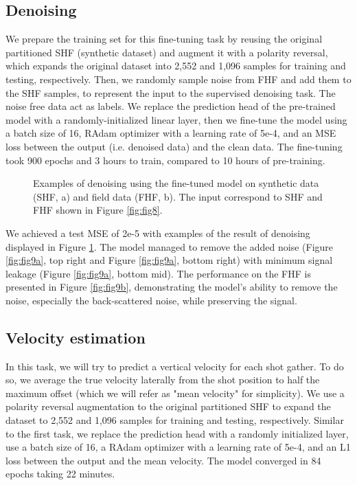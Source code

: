 \documentclass{article}
\begin{document}
\subsection{Denoising}
\label{sec:denoising_field}
We prepare the training set for this fine-tuning task by reusing the original partitioned SHF (synthetic dataset) and augment it with a polarity reversal, which expands the original dataset into 2,552 and 1,096 samples for training and testing, respectively. Then, we randomly sample noise from FHF and add them to the SHF samples, to represent the input to the supervised denoising task. The noise free data act as labels. We replace the prediction head of the pre-trained model with a randomly-initialized linear layer, then we fine-tune the model using a batch size of 16, RAdam optimizer with a learning rate of 5e-4, and an MSE loss between the output (i.e. denoised data) and the clean data. The fine-tuning took 900 epochs and 3 hours to train, compared to 10 hours of pre-training.

\begin{figure}[h]
    \centering
    \caption{Examples of denoising using the fine-tuned model on synthetic data (SHF, a) and field data (FHF, b). The input correspond to SHF and FHF shown in Figure \ref{fig:fig8}.}
    \label{fig:fig9}
\end{figure}

We achieved a test MSE of 2e-5 with examples of the result of denoising displayed in Figure \ref{fig:fig9}. The model managed to remove the added noise (Figure \ref{fig:fig9a}, top right and Figure \ref{fig:fig9a}, bottom right) with minimum signal leakage (Figure \ref{fig:fig9a}, bottom mid). The performance on the FHF is presented in Figure \ref{fig:fig9b}, demonstrating the model's ability to remove the noise, especially the back-scattered noise, while preserving the signal.

\subsection{Velocity estimation}
\label{sec:velpred_field}
In this task, we will try to predict a vertical velocity for each shot gather. To do so, we average the true velocity laterally from the shot position to half the maximum offset (which we will refer as "mean velocity" for simplicity). We use a polarity reversal augmentation to the original partitioned SHF to expand the dataset to 2,552 and 1,096 samples for training and testing, respectively. Similar to the first task, we replace the prediction head with a randomly initialized layer, use a batch size of 16, a RAdam optimizer with a learning rate of 5e-4, and an L1 loss between the output and the mean velocity. The model converged in 84 epochs taking 22 minutes.
\end{document}
